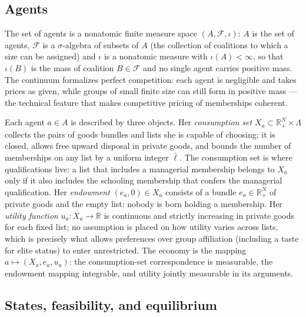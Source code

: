 \documentclass[12pt,letterpaper]{article}
\theoremstyle{definition}
\newcommand{\R}{\mathbb{R}}
\begin{document}
\subsection{Agents}

The set of agents is a nonatomic finite measure space $(A,\mathcal{F},\iota)$: $A$ is the set of agents, $\mathcal{F}$ is a $\sigma$-algebra of subsets of $A$ (the collection of coalitions to which a size can be assigned) and $\iota$ is a nonatomic measure with $\iota(A)<\infty$, so that $\iota(B)$ is the mass of coalition $B\in\mathcal{F}$ and no single agent carries positive mass.
The continuum formalizes perfect competition: each agent is negligible and takes prices as given, while groups of small finite size can still form in positive mass --- the technical feature that makes competitive pricing of memberships coherent.

Each agent $a\in A$ is described by three objects.
Her \emph{consumption set} $X_a\subset\R^N_+\times\Lambda$ collects the pairs of goods bundles and lists she is capable of choosing; it is closed, allows free upward disposal in private goods, and bounds the number of memberships on any list by a uniform integer $\bar{\ell}$.
The consumption set is where qualifications live: a list that includes a managerial membership belongs to $X_a$ only if it also includes the schooling membership that confers the managerial qualification.
Her \emph{endowment} $(e_a,0)\in X_a$ consists of a bundle $e_a\in\R^N_+$ of private goods and the empty list: nobody is born holding a membership.
Her \emph{utility function} $u_a:X_a\rightarrow\R$ is continuous and strictly increasing in private goods for each fixed list; no assumption is placed on how utility varies across lists, which is precisely what allows preferences over group affiliation (including a taste for elite status) to enter unrestricted.
The economy is the mapping $a\mapsto(X_a,e_a,u_a)$: the consumption-set correspondence is measurable, the endowment mapping integrable, and utility jointly measurable in its arguments.

\subsection{States, feasibility, and equilibrium}
\end{document}
